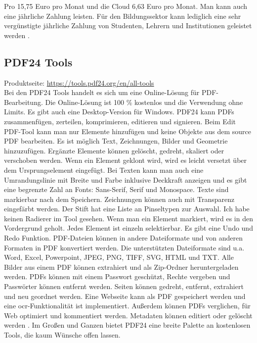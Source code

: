 Pro 15,75 Euro pro Monat und die Cloud 6,63 Euro pro Monat. Man kann auch eine jährliche Zahlung leisten. Für den Bildungssektor kann lediglich eine sehr vergünstigte jährliche Zahlung von Studenten, Lehrern und Institutionen geleistet werden \cite{foxit-editor}. 

\subsection{PDF24 Tools}
Produktseite: \url{https://tools.pdf24.org/en/all-tools} \\
Bei den PDF24 Tools handelt es sich um eine Online-Lösung für PDF-Bearbeitung. Die Online-Lösung ist 100 \% kostenlos und die Verwendung ohne Limits. Es gibt auch eine Desktop-Version für Windows. PDF24 kann PDFs zusammenfügen, zerteilen, komprimieren, editieren und signieren. Beim Edit PDF-Tool kann man nur Elemente hinzufügen und keine Objekte aus dem source PDF bearbeiten. Es ist möglich Text, Zeichnungen, Bilder und Geometrie hinzuzufügen. Ergänzte Elemente können gelöscht, gedreht, skaliert oder verschoben werden. Wenn ein Element geklont wird, wird es leicht versetzt über dem Ursprungselement eingefügt. Bei Texten kann man auch eine Umrandungslinie mit Breite und Farbe inklusive Deckkraft anzeigen und es gibt eine begrenzte Zahl an Fonts: Sans-Serif, Serif und Monospace. Texte sind markierbar nach dem Speichern. Zeichnungen können auch mit Transparenz eingefärbt werden. Der Stift hat eine Liste an Pinseltypen zur Auswahl. Ich habe keinen Radierer im Tool gesehen. Wenn man ein Element markiert, wird es in den Vordergrund geholt. Jedes Element ist einzeln selektierbar. Es gibt eine Undo und Redo Funktion. PDF-Dateien können in andere Dateiformate und von anderen Formaten in PDF konvertiert werden. Die unterstützten Dateiformate sind u.a. Word, Excel, Powerpoint, JPEG, PNG, TIFF, SVG, HTML und TXT. Alle Bilder aus einem PDF können extrahiert und als Zip-Ordner heruntergeladen werden. PDFs können mit einem Passwort geschützt, Rechte vergeben und Passwörter können entfernt werden. Seiten können gedreht, entfernt, extrahiert und neu geordnet werden. Eine Webseite kann als PDF gespeichert werden und eine \gls{ocr}-Funktionalität ist implementiert. Außerdem können PDFs verglichen, für Web optimiert und kommentiert werden. Metadaten können editiert oder gelöscht werden \cite{pdf24}. Im Großen und Ganzen bietet PDF24 eine breite Palette an kostenlosen Tools, die kaum Wünsche offen lassen.

